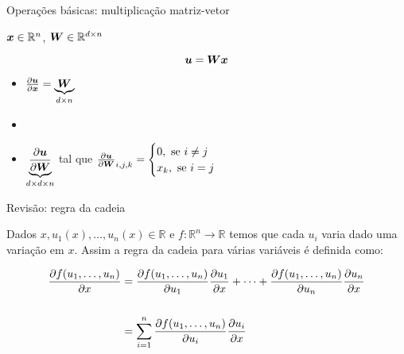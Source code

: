 \documentclass[10pt]{beamer}
\begin{document}
\begin{frame}{Operações básicas: multiplicação matriz-vetor}
\Large{
$\bm{x}\in \mathbb{R}^{n}$, $\bm{W} \in \mathbb{R}^{d\times n}$ 

\vspace{0.3 cm}

\begin{equation*}
\bm{u} = \bm{W}\bm{x}
\end{equation*}



\vspace{0.3 cm}
\begin{itemize}
\item $\frac{\partial \bm{u}}{\partial \bm{x}} = \underbrace{\bm{W}}_{d \times n}$
\item[]



\item $\underbrace{\frac{\partial \bm{u}}{\partial \bm{W}}}_{d\times d \times n}$ tal que $\frac{\partial \bm{u}}{\partial \bm{W}} _{i,j,k} = \begin{cases}
0, \text{ se } i \neq j\\
x_k, \text{ se } i = j\\
\end{cases}$
\end{itemize}
}
\end{frame}


\begin{frame}{Revisão: regra da cadeia}

Dados $x, u_1(x), \dots, u_n(x) \in \mathbb{R}$ e $f:\mathbb{R}^{n} \rightarrow \mathbb{R}$ temos que cada $u_i$ varia dado uma variação em $x$. Assim a regra da cadeia para várias variáveis é definida como:

\vspace{0.3 cm}

\begin{align*}
\frac{\partial f(u_1, \dots, u_n)}{\partial x} &= \frac{\partial f(u_1, \dots, u_n)}{\partial u_1}\frac{\partial u_1}{\partial x} + \dots +  \frac{\partial f(u_1, \dots, u_n)}{\partial u_n}\frac{\partial u_n}{\partial x}\\
&\\
&= \sum_{i=1}^{n} \frac{\partial f(u_1, \dots, u_n)}{\partial u_i}\frac{\partial u_i}{\partial x}\\
\end{align*}
\end{frame}
\end{document}
